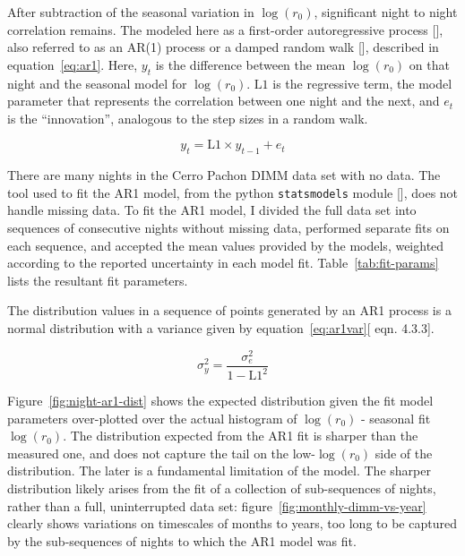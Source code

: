 \documentclass[\docopts]{\docclass}
\begin{document}
After subtraction of the seasonal variation in $\log(r_0)$,
significant night to night correlation remains. The modeled here as a
first-order autoregressive process [\cite{cryer_time_2008}], also
referred to as an AR(1) process or a damped random walk
[\cite{2009ApJ...698..895K}], described in
equation~\ref{eq:ar1}. Here, $y_t$ is the difference between the mean
$\log(r_0)$ on that night and the seasonal model for
$\log(r_0)$. $\mbox{L1}$ is the regressive term, the model parameter
that represents the correlation between one night and the next, and
$e_t$ is the ``innovation'', analogous to the step sizes in a random
walk.

\begin{equation} \label{eq:ar1}
y_t = \mbox{L1} \times y_{t-1} + e_t
\end{equation}

There are many nights in the Cerro Pachon DIMM data set with no data.
The tool used to fit the AR1 model, from the python
\texttt{statsmodels} module [\cite{seabold2010statsmodels}], does not
handle missing data. To fit the AR1 model, I divided the full data set
into sequences of consecutive nights without missing data, performed
separate fits on each sequence, and accepted the mean values provided
by the models, weighted according to the reported uncertainty in each
model fit. Table~\ref{tab:fit-params} lists the resultant fit
parameters.

The distribution values in a sequence of points generated by an AR1
process is a normal distribution with a variance given by
equation~\ref{eq:ar1var}[\cite{cryer_time_2008} eqn. 4.3.3].

\begin{equation} \label{eq:ar1var}
\sigma_y^2 = \frac{\sigma_e^2}{1-\mbox{L1}^2}
\end{equation}

Figure~\ref{fig:night-ar1-dist} shows the expected distribution given
the fit model parameters over-plotted over the actual histogram of
$\log(r_0)$ - seasonal fit $\log(r_0)$. The distribution expected from
the AR1 fit is sharper than the measured one, and does not capture the
tail on the low-$\log(r_0)$ side of the distribution. The later is a
fundamental limitation of the model. The sharper distribution likely
arises from the fit of a collection of sub-sequences of nights, rather
than a full, uninterrupted data set:
figure~\ref{fig:monthly-dimm-vs-year} clearly shows variations on
timescales of months to years, too long to be captured by the
sub-sequences of nights to which the AR1 model was fit.
\end{document}
